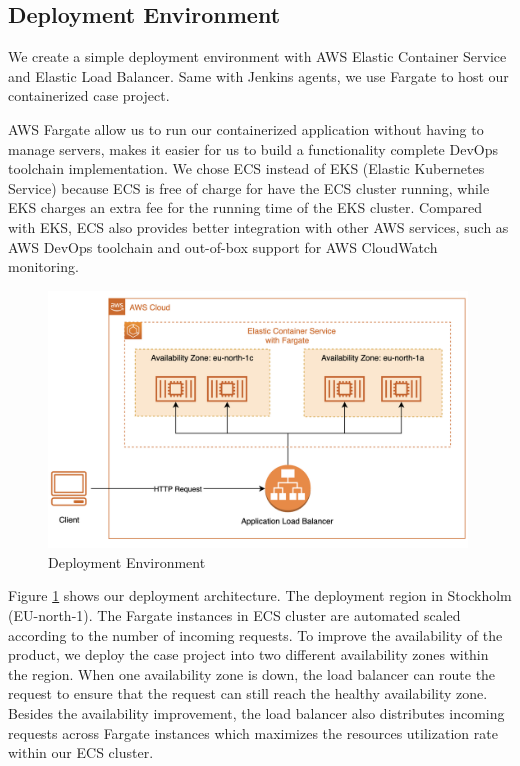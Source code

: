 \subsection{Deployment Environment}
We create a simple deployment environment with AWS Elastic Container Service and Elastic Load Balancer. Same with Jenkins agents, we use Fargate to host our containerized case project. 
\par
AWS Fargate allow us to run our containerized application without having to manage servers, makes it easier for us to build a functionality complete DevOps toolchain implementation. We chose ECS instead of EKS (Elastic Kubernetes Service) because ECS is free of charge for have the ECS cluster running, while EKS charges an extra fee for the running time of the EKS cluster. Compared with EKS, ECS also provides better integration with other AWS services, such as AWS DevOps toolchain and out-of-box support for AWS CloudWatch monitoring.
\begin{figure}[h]
     \centering
     \includegraphics[width=0.99\textwidth]{pics/deploy.png}
     \caption{Deployment Environment}
     \label{fig:deploy}
\end{figure}
\par
Figure \ref{fig:deploy} shows our deployment architecture. The deployment region in Stockholm (EU-north-1). The Fargate instances in ECS cluster are automated scaled according to the number of incoming requests.
To improve the availability of the product, we deploy the case project into two different availability zones within the region.
When one availability zone is down, the load balancer can route the request to ensure that the request can still reach the healthy availability zone. Besides the availability improvement, the load balancer also distributes incoming requests across Fargate instances which maximizes the resources utilization rate within our ECS cluster.
